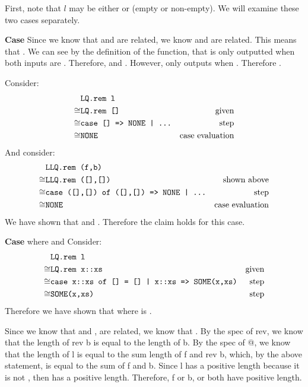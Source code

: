 \documentclass[11pt,letterpaper]{article}
\begin{document}
First, note that $l$ may be either \sml{[]} or  (empty or non-empty).
We will examine these two cases separately.

\textbf{Case }
Since we know that  and  are related, we know \sml{[]} and  are related.
This means that . We can see by the definition of the  function,
that \sml{[]} is only outputted when both inputs are \sml{[]}.
Therefore,  and .
However,  only outputs \sml{[]} when . Therefore .

Consider:
\begin{align*}
      & \texttt{LQ.rem l} &\\
\cong & \texttt{LQ.rem []} &\text{given}\\
\cong & \texttt{case [] => NONE | ...} &\text{step}\\
\cong & \texttt{NONE}&\text{case evaluation}
\end{align*}
And consider:
\begin{align*}
      & \texttt{LLQ.rem (f,b)} &\\
\cong & \texttt{LLQ.rem ([],[])} &\text{shown above}\\
\cong & \texttt{case ([],[]) of ([],[]) => NONE | ...}&\text{step}\\
\cong & \texttt{NONE} & \text{case evaluation}
\end{align*}
We have shown that  and .
Therefore the claim holds for this case.

\textbf{Case } where  and 
Consider:
\begin{align*}
      & \texttt{LQ.rem l} & \\
\cong & \texttt{LQ.rem x::xs} & \text{given} \\
\cong & \texttt{case x::xs of [] = [] | x::xs => SOME(x,xs)} & \text{step} \\
\cong & \texttt{SOME(x,xs)} & \text{step}
\end{align*}
Therefore we have shown that  where  is .

Since we know that  and , are related, we know that . 
By the spec of rev, we know that the length of rev b is equal to the length of b.
By the spec of @, we know that the length of l is equal to the sum length of f and rev b,
which, by the above statement, is equal to the sum of f and b. Since l has a positive length
because it is not \sml{[]}, then  has a positive length. Therefore, f or b, or both have positive length.
\end{document}
